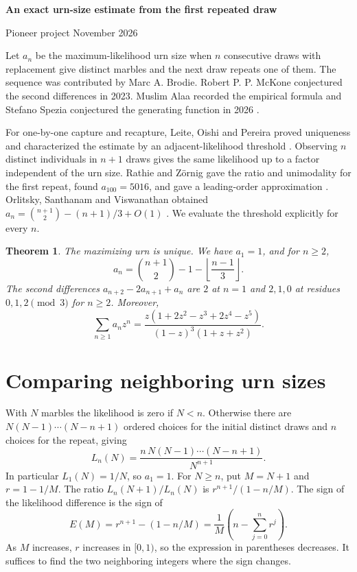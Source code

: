 \documentclass[11pt,letterpaper]{article}
\newtheorem{theorem}{Theorem}
\begin{document}
\begin{center}
{\Large\bfseries An exact urn-size estimate from the first repeated draw}\par
Pioneer project  November 2026
\end{center}

\begin{abstract}
With uniform sampling from an urn, suppose the first repeat is draw $n+1$.
We prove that the unique maximum-likelihood urn size for $n\geq2$ is
$\binom{n+1}{2}-1-\lfloor(n-1)/3\rfloor$.
A monotone comparison of adjacent likelihoods and two finite binomial
bounds locate the maximum. This proves the empirical formula, second
difference conjecture and generating function recorded in OEIS A111097.
\end{abstract}

Let $a_n$ be the maximum-likelihood urn size when $n$ consecutive draws
with replacement give distinct marbles and the next draw repeats one of
them. The sequence was contributed by Marc A. Brodie. Robert P. P. McKone
conjectured the second differences in 2023. Muslim Alaa recorded the
empirical formula and Stefano Spezia conjectured the generating function
in 2026 \cite{oeis}.

For one-by-one capture and recapture, Leite, Oishi and Pereira proved
uniqueness and characterized the estimate by an adjacent-likelihood
threshold \cite{leite}. Observing $n$ distinct individuals in $n+1$ draws
gives the same likelihood up to a factor independent of the urn size.
Rathie and Z\"ornig gave the ratio and unimodality for the first repeat,
found $a_{100}=5016$, and gave a leading-order approximation
\cite[Example~2.3, equations~(2.7)--(2.9)]{rathie}.
Orlitsky, Santhanam and Viswanathan obtained
$a_n=\binom{n+1}{2}-(n+1)/3+O(1)$ \cite[Lemma~7]{orlitsky}.
We evaluate the threshold explicitly for every $n$.

\begin{theorem}\label{th:urn}
The maximizing urn is unique. We have $a_1=1$, and for $n\geq2$,
\[
 a_n=\binom{n+1}{2}-1-\left\lfloor\frac{n-1}{3}\right\rfloor.
\]
The second differences $a_{n+2}-2a_{n+1}+a_n$ are $2$ at $n=1$ and
$2,1,0$ at residues $0,1,2\pmod3$ for $n\geq2$. Moreover,
\[
 \sum_{n\geq1}a_n z^n
  =\frac{z(1+2z^2-z^3+2z^4-z^5)}{(1-z)^3(1+z+z^2)}.
\]
\end{theorem}

\section{Comparing neighboring urn sizes}
With $N$ marbles the likelihood is zero if $N<n$. Otherwise there are
$N(N-1)\cdots(N-n+1)$ ordered choices for the initial distinct draws and
$n$ choices for the repeat, giving
\[
 L_n(N)=\frac{n\,N(N-1)\cdots(N-n+1)}{N^{n+1}}.
\]
In particular $L_1(N)=1/N$, so $a_1=1$. For $N\geq n$, put $M=N+1$ and
$r=1-1/M$. The ratio $L_n(N+1)/L_n(N)$ is $r^{n+1}/(1-n/M)$.
The sign of the likelihood difference is the sign of
\[
 E(M)=r^{n+1}-(1-n/M)=\frac1M\left(n-\sum_{j=0}^{n}r^j\right).
\]
As $M$ increases, $r$ increases in $[0,1)$, so the expression in parentheses
decreases. It suffices to find the two neighboring integers where the sign
changes.
\end{document}
